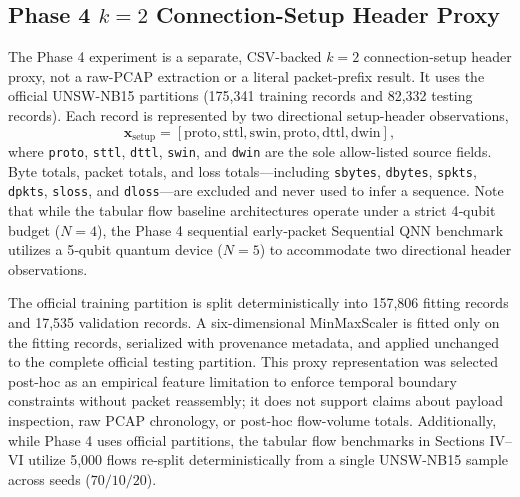\documentclass[conference]{IEEEtran}
\begin{document}
\subsection{Phase 4 \texorpdfstring{$k=2$}{k=2} Connection-Setup Header Proxy}
The Phase 4 experiment is a separate, CSV-backed $k=2$ connection-setup header proxy, not a raw-PCAP extraction or a literal packet-prefix result. It uses the official UNSW-NB15 partitions (175,341 training records and 82,332 testing records). Each record is represented by two directional setup-header observations,
\begin{equation}
\mathbf{x}_{\mathrm{setup}} =
[\mathrm{proto},\mathrm{sttl},\mathrm{swin},
\mathrm{proto},\mathrm{dttl},\mathrm{dwin}],
\end{equation}
where \texttt{proto}, \texttt{sttl}, \texttt{dttl}, \texttt{swin}, and \texttt{dwin} are the sole allow-listed source fields. Byte totals, packet totals, and loss totals---including \texttt{sbytes}, \texttt{dbytes}, \texttt{spkts}, \texttt{dpkts}, \texttt{sloss}, and \texttt{dloss}---are excluded and never used to infer a sequence. Note that while the tabular flow baseline architectures operate under a strict 4‑qubit budget ($N=4$), the Phase 4 sequential early‑packet Sequential QNN benchmark utilizes a 5‑qubit quantum device ($N=5$) to accommodate two directional header observations.

The official training partition is split deterministically into 157,806 fitting records and 17,535 validation records. A six-dimensional MinMaxScaler is fitted only on the fitting records, serialized with provenance metadata, and applied unchanged to the complete official testing partition. This proxy representation was selected post-hoc as an empirical feature limitation to enforce temporal boundary constraints without packet reassembly; it does not support claims about payload inspection, raw PCAP chronology, or post-hoc flow-volume totals. Additionally, while Phase 4 uses official partitions, the tabular flow benchmarks in Sections IV--VI utilize 5,000 flows re-split deterministically from a single UNSW-NB15 sample across seeds ($70/10/20$).

\begin{table}[t]
\caption{Official 82,332-flow test results for the $k=2$ connection-setup header proxy (seed 42).}
\label{tab:phase4_proxy}
\centering
\small
{}
\end{table}
\end{document}
